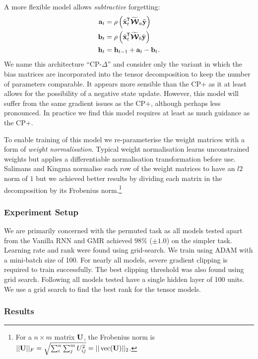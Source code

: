 A more flexible model allows \emph{subtractive} forgetting:
\begin{align}\label{eq:cpdelta}
	\mathbf{a}_t &= \rho\left(\tilde{\mathbf{x}}^{\mkern-1.5mu\mathsf{T}}_t\widetilde{\bm{\mathcal{W}}}_a\tilde{\mathbf{y}}\right)\\
	\mathbf{b}_t &= \rho\left(\tilde{\mathbf{x}}^{\mkern-1.5mu\mathsf{T}}_t\widetilde{\bm{\mathcal{W}}}_b\tilde{\mathbf{y}}\right)\\
	\mathbf{h}_t &= \mathbf{h}_{t-1} + \mathbf{a}_t - \mathbf{b}_t.
\end{align} We name this architecture ``CP-\(\Delta\)'' and consider only the variant in
which the bias matrices are incorporated into the tensor decomposition to keep the number
of parameters comparable. It appears more sensible
than the CP+ as it at least allows for the possibility of a negative state update.
However, this model will suffer from the same gradient issues as the CP+, although
perhaps less pronounced. In practice we find this model requires at least as much guidance as the CP+.

To enable training of this model we re-parameterise the weight matrices with a
form of \emph{weight normalisation}. Typical
weight normalisation learns unconstrained weights but applies a differentiable
normalisation transformation before use. Salimans and Kingma normalise each
row of the weight matrices to have an \(l2\) norm of \(1\) \autocite{Salimans2016a}
but we achieved
better results by dividing each matrix in the decomposition by its Frobenius norm.\footnote{
For a \(n \times m\) matrix \(\mathbf{U}\), the Frobenius norm is
\(||\mathbf{U}||_F = \sqrt{\sum_i^n\sum_j^mU_{ij}^2} = ||\operatorname{vec}(\mathbf{U})||_2\).}

\subsubsection{Experiment Setup}
We are primarily concerned with the permuted task as all models tested apart
from the Vanilla RNN and GMR achieved \(98\%\) (\(\pm 1.0\)) on the simpler task.
Learning rate and rank
were found using grid-search. We train using ADAM with a mini-batch size of 100.
For nearly all models, severe gradient clipping \autocite{Pascanu2013} is
required to train successfully. The best clipping threshold was also found using grid
search.
Following \autocite{Le2015} all models tested have a single hidden layer of 100 units.
We use a grid search to find the best rank for the tensor models.

\subsubsection{Results}

